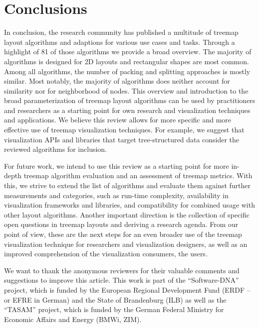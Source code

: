 \documentclass[sigconf%
,natbib=true%
]{acmart}
\begin{document}
\section{Conclusions}

In conclusion, the research community has published a multitude of treemap layout algorithms and adaptions for various use cases and tasks.
Through a highlight of 81 of those algorithms we provide a broad overview.
The majority of algorithms is designed for 2D layouts and rectangular shapes are most common.
Among all algorithms, the number of packing and splitting approaches is mostly similar.
Most notably, the majority of algorithms does neither account for similarity nor for neighborhood of nodes.
This overview and introduction to the broad parameterization of treemap layout algorithms can be used by practitioners and researchers as a starting point for own research and visualization techniques and applications.
We believe this review allows for more specific and more effective use of treemap visualization techniques.
For example, we suggest that visualization APIs and libraries that target tree-structured data consider the reviewed algorithms for inclusion.
\par
For future work, we intend to use this review as a starting point for more in-depth treemap algorithm evaluation and an assessment of treemap metrics.
With this, we strive to extend the list of algorithms and evaluate them against further measurements and categories, such as run-time complexity, availability in visualization frameworks and libraries, and compatibility for combined usage with other layout algorithms.
Another important direction is the collection of specific open questions in treemap layouts and deriving a research agenda.
From our point of view, these are the next steps for an even broader use of the treemap visualization technique for researchers and visualization designers, as well as an improved comprehension of the visualization consumers, the users.

\begin{acks}
We want to thank the anonymous reviewers for their valuable comments and suggestions to improve this article.
This work is part of the \enquote{Software-DNA} project, which is funded by the
European Regional Development Fund (ERDF -- or EFRE in German) and the
State of Brandenburg (ILB) as well as the \enquote{TASAM} project, which is funded by the German Federal Ministry for Economic Affairs and Energy (BMWi, ZIM).
\end{acks}



\end{document}
